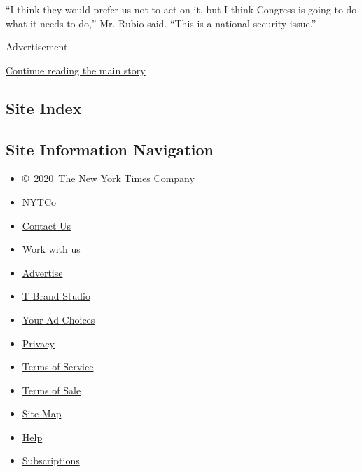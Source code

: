 ``I think they would prefer us not to act on it, but I think Congress is
going to do what it needs to do,'' Mr. Rubio said. ``This is a national
security issue.''

Advertisement

\protect\hyperlink{after-bottom}{Continue reading the main story}

\hypertarget{site-index}{%
\subsection{Site Index}\label{site-index}}

\hypertarget{site-information-navigation}{%
\subsection{Site Information
Navigation}\label{site-information-navigation}}

\begin{itemize}
\tightlist
\item
  \href{https://help.nytimes.com/hc/en-us/articles/115014792127-Copyright-notice}{©~2020~The
  New York Times Company}
\end{itemize}

\begin{itemize}
\tightlist
\item
  \href{https://www.nytco.com/}{NYTCo}
\item
  \href{https://help.nytimes.com/hc/en-us/articles/115015385887-Contact-Us}{Contact
  Us}
\item
  \href{https://www.nytco.com/careers/}{Work with us}
\item
  \href{https://nytmediakit.com/}{Advertise}
\item
  \href{http://www.tbrandstudio.com/}{T Brand Studio}
\item
  \href{https://www.nytimes.com/privacy/cookie-policy\#how-do-i-manage-trackers}{Your
  Ad Choices}
\item
  \href{https://www.nytimes.com/privacy}{Privacy}
\item
  \href{https://help.nytimes.com/hc/en-us/articles/115014893428-Terms-of-service}{Terms
  of Service}
\item
  \href{https://help.nytimes.com/hc/en-us/articles/115014893968-Terms-of-sale}{Terms
  of Sale}
\item
  \href{https://spiderbites.nytimes.com}{Site Map}
\item
  \href{https://help.nytimes.com/hc/en-us}{Help}
\item
  \href{https://www.nytimes.com/subscription?campaignId=37WXW}{Subscriptions}
\end{itemize}
